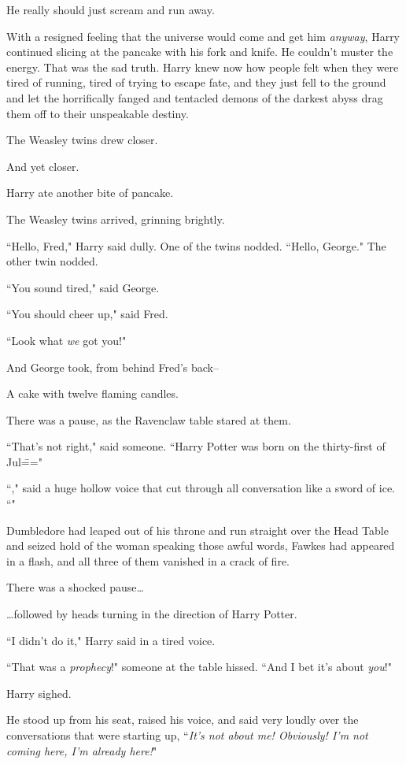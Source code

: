 He really should just scream and run away.

With a resigned feeling that the universe would come and get him \emph{anyway}, Harry continued slicing at the pancake with his fork and knife. He couldn't muster the energy. That was the sad truth. Harry knew now how people felt when they were tired of running, tired of trying to escape fate, and they just fell to the ground and let the horrifically fanged and tentacled demons of the darkest abyss drag them off to their unspeakable destiny.

The Weasley twins drew closer.

And yet closer.

Harry ate another bite of pancake.

The Weasley twins arrived, grinning brightly.

``Hello, Fred," Harry said dully. One of the twins nodded. ``Hello, George." The other twin nodded.

``You sound tired," said George.

``You should cheer up," said Fred.

``Look what \emph{we} got you!"

And George took, from behind Fred's back\---

A cake with twelve flaming candles.

There was a pause, as the Ravenclaw table stared at them.

``That's not right," said someone. ``Harry Potter was born on the thirty-first of Jul\==="

``," said a huge hollow voice that cut through all conversation like a sword of ice. ``"

Dumbledore had leaped out of his throne and run straight over the Head Table and seized hold of the woman speaking those awful words, Fawkes had appeared in a flash, and all three of them vanished in a crack of fire.

There was a shocked pause{\ldots}

{\ldots}followed by heads turning in the direction of Harry Potter.

``I didn't do it," Harry said in a tired voice.

``That was a \emph{prophecy}!" someone at the table hissed. ``And I bet it's about \emph{you}!"

Harry sighed.

He stood up from his seat, raised his voice, and said very loudly over the conversations that were starting up, ``\emph{It's not about me! Obviously! I'm not coming here, I'm already here!}"

